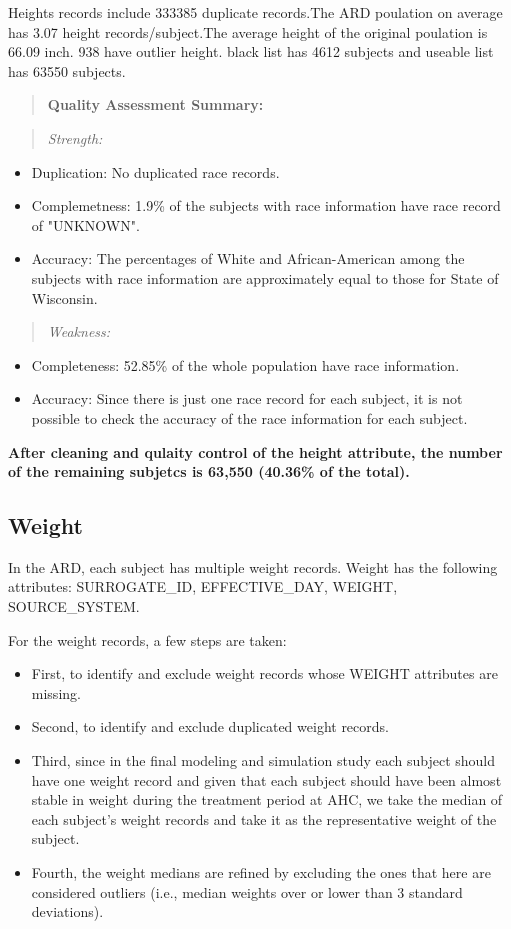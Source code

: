 \documentclass{article}
\begin{document}
Heights records include 333385 duplicate records.The ARD poulation on average has 3.07 height records/subject.The average height of the original poulation is 66.09 inch.  938 have outlier height. 
black list has 4612 subjects and useable list has 63550 subjects.

\begin{quote}
\textbf{Quality Assessment Summary:}
\end{quote}
\begin{quote}
\emph{Strength:}
\end{quote}
\begin{itemize}
  \item Duplication: No duplicated race records.
  \item Complemetness: 1.9\% of the subjects with race information have race record of "UNKNOWN".
  \item Accuracy: The percentages of White and African-American among the subjects with race information are approximately equal to those for State of Wisconsin.
\end{itemize}
\begin{quote}
\emph{Weakness:}
\end{quote}
\begin{itemize}
  \item Completeness: 52.85\% of the whole population have race information.
  \item Accuracy: Since there is just one race record for each subject, it is not possible to check the accuracy of the race information for each subject.
\end{itemize}


\textbf{After cleaning and qulaity control of the height attribute, the number of the remaining subjetcs is 63,550 (40.36\% of the total).}

\subsection{Weight}
In the ARD, each subject has multiple weight records. Weight has the following attributes:
SURROGATE\_ID, EFFECTIVE\_DAY, WEIGHT, SOURCE\_SYSTEM.

For the weight records, a few steps are taken:
\begin{itemize}
  \item First, to identify and exclude weight records whose WEIGHT attributes are missing.
  \item Second, to identify and exclude duplicated weight records.
  \item Third, since in the final modeling and simulation study each subject should have one weight record and given that each subject should have been almost stable in weight during the treatment period at AHC, we take the median of each subject's weight records and take it as the representative weight of the subject. 
  \item Fourth, the weight medians are refined by excluding the ones that here are considered outliers (i.e., median weights over or lower than 3 standard deviations). 
\end{itemize}
\end{document}
